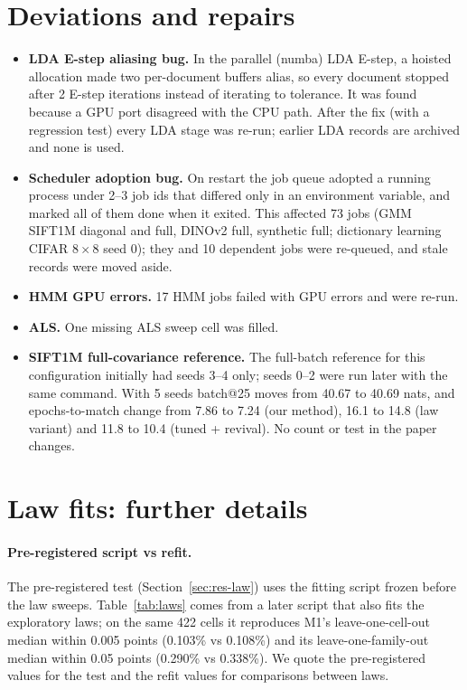 \documentclass[10pt]{article}
\begin{document}
\section{Deviations and repairs}\label{app:repairs}
\begin{itemize}[nosep]
  \item \textbf{LDA E-step aliasing bug.} In the parallel (numba) LDA E-step, a hoisted allocation made two
        per-document buffers alias, so every document stopped after 2 E-step iterations instead of iterating to
        tolerance. It was found because a GPU port disagreed with the CPU path. After the fix (with a regression
        test) every LDA stage was re-run; earlier LDA records are archived and none is used.
  \item \textbf{Scheduler adoption bug.} On restart the job queue adopted a running process under 2--3 job ids that
        differed only in an environment variable, and marked all of them done when it exited. This affected 73 jobs
        (GMM SIFT1M diagonal and full, DINOv2 full, synthetic full; dictionary learning CIFAR $8{\times}8$ seed 0);
        they and 10 dependent jobs were re-queued, and stale records were moved aside.
  \item \textbf{HMM GPU errors.} 17 HMM jobs failed with GPU errors and were re-run.
  \item \textbf{ALS.} One missing ALS sweep cell was filled.
  \item \textbf{SIFT1M full-covariance reference.} The full-batch reference for this configuration initially had
        seeds 3--4 only; seeds 0--2 were run later with the same command. With 5 seeds batch@25 moves from 40.67 to
        40.69 nats, and epochs-to-match change from 7.86 to 7.24 (our method), 16.1 to 14.8 (law variant) and 11.8
        to 10.4 (tuned + revival). No count or test in the paper changes.
\end{itemize}

\section{Law fits: further details}\label{app:law}
\paragraph{Pre-registered script vs refit.} The pre-registered test (Section~\ref{sec:res-law}) uses the fitting
script frozen before the law sweeps. Table~\ref{tab:laws} comes from a later script that also fits the exploratory
laws; on the same 422 cells it reproduces M1's leave-one-cell-out median within 0.005 points (0.103\% vs 0.108\%) and
its leave-one-family-out median within 0.05 points (0.290\% vs 0.338\%). We quote the pre-registered values for the
test and the refit values for comparisons between laws.
\end{document}
